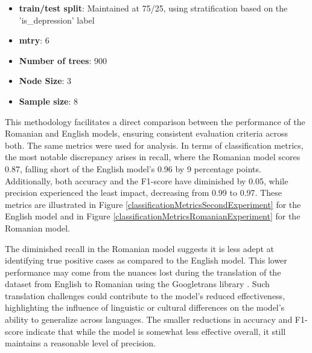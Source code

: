 \begin{itemize}
\item \textbf{train/test split}: Maintained at 75/25, using stratification based on the 'is\_depression' label
\item \textbf{mtry}: 6
\item \textbf{Number of trees}: 900
\item \textbf{Node Size}: 3
\item \textbf{Sample size}: 8
\end{itemize}

This methodology facilitates a direct comparison between the performance of the Romanian and English models, ensuring consistent evaluation criteria across both. The same metrics were used for analysis. In terms of classification metrics, the most notable discrepancy arises in recall, where the Romanian model scores 0.87, falling short of the English model's 0.96 by 9 percentage points. Additionally, both accuracy and the F1-score have diminished by 0.05, while precision experienced the least impact, decreasing from 0.99 to 0.97. These metrics are illustrated in Figure \ref{classificationMetricsSecondExperiment} for the English model and in Figure \ref{classificationMetricsRomanianExperiment} for the Romanian model.

The diminished recall in the Romanian model suggests it is less adept at identifying true positive cases as compared to the English model. This lower performance may come from the nuances lost during the translation of the dataset from English to Romanian using the Googletrans library \cite{googletranslib}. Such translation challenges could contribute to the model’s reduced effectiveness, highlighting the influence of linguistic or cultural differences on the model’s ability to generalize across languages. The smaller reductions in accuracy and F1-score indicate that while the model is somewhat less effective overall, it still maintains a reasonable level of precision.

